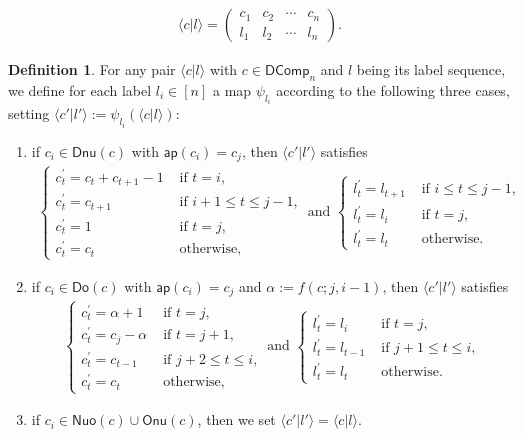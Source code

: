 \documentclass[reqno]{amsart}
\numberwithin{equation}{section}
\theoremstyle{definition}
\newtheorem{definition}{Definition}[section]
\theoremstyle{named}
\def\DComp{\mathsf{DComp}}
\def\Nuo{\mathsf{Nuo}}
\def\Onu{\mathsf{Onu}}
\def\Dnu{\mathsf{Dnu}}
\def\Do{\mathsf{Do}}
\def\ap{\mathsf{ap}}
\begin{document}
\begin{align*}
\langle c|l \rangle=
\begin{pmatrix}
c_1 & c_2 & \cdots & c_n \\
l_1 & l_2 & \cdots & l_n
\end{pmatrix}.
\end{align*}


\begin{definition}\label{def-psi}
For any pair $\langle c|l\rangle$ with $c\in\DComp_n$ and $l$ being its label sequence, we define for each label $l_i\in[n]$ a map $\psi_{l_i}$ according to the following three cases, setting $\langle c'|l'\rangle:=\psi_{l_i}(\langle c|l\rangle)$:

\begin{enumerate}
	\item if $c_i\in \Dnu(c)$ with $\ap(c_i)=c_j$, then $\langle c'|l'\rangle$ satisfies 
	\begin{align*}
		\begin{cases}
			c_t^{\prime}=c_t+c_{t+1}-1  &  \text{ if  $t=i$,} \\
			c_t^{\prime}=c_{t+1}& \text{ if $i+1\le t\le j-1$,}  \\
			c_t^{\prime}=1& \text{ if $t=j$, } \\
			c_t^{\prime}=c_t& \text{ otherwise,} 
		\end{cases}
		\text{ and } 
	\begin{cases}
		l_t^{\prime}=l_{t+1}  &  \text{ if $i\le t\le j-1$,}  \\
		l_t^{\prime}=l_{i}& \text{ if $t=j$,}  \\
		l_t^{\prime}=l_t& \text{ otherwise.} 
	\end{cases}
	\end{align*}
	\item if $c_i\in \Do(c)$ with $\ap(c_i)=c_j$ and $\alpha:=f(c;j,i-1)$, then $\langle c'|l'\rangle$ satisfies
	\begin{align*}
		\begin{cases}
			c_t^{\prime}=\alpha+1  &  \text{ if  $t=j$, }\\
			c_t^{\prime}=c_j-\alpha& \text{ if $t=j+1$,}  \\
			c_t^{\prime}=c_{t-1}& \text{ if $j+2\le t\le i$,}  \\
			c_t^{\prime}=c_t& \text{ otherwise,}
		\end{cases}
	\text{ and }
	\begin{cases}
			l_t^{\prime}=l_i  &  \text{ if $t=j$, } \\
			l_t^{\prime}=l_{t-1}& \text{ if $j+1\le t\le i$,}  \\
			l_t^{\prime}=l_t& \text{ otherwise. }
	\end{cases}
	\end{align*}	
	\item if $c_i\in\Nuo(c)\cup \Onu(c)$, then we set $\langle c'|l'\rangle=\langle c|l\rangle$.
\end{enumerate}
\end{definition}
\end{document}
